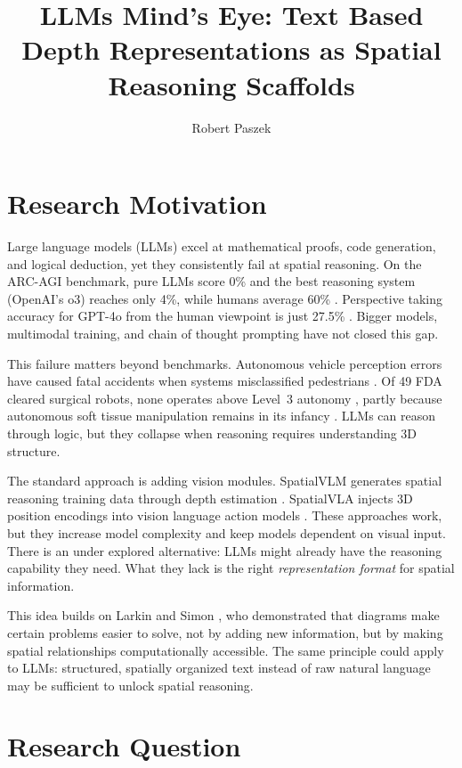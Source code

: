 \documentclass[stu,12pt,a4paper,floatsintext]{apa7}
\title{LLMs Mind's Eye: Text Based Depth Representations as Spatial Reasoning Scaffolds}
\author{Robert Paszek}
\affiliation{Department of Cognitive Science and Artificial Intelligence, Tilburg University}
\begin{document}
\maketitle

\section*{Research Motivation}

Large language models (LLMs) excel at mathematical proofs, code generation, and logical deduction, yet they consistently fail at spatial reasoning. On the ARC\nobreakdash-AGI benchmark, pure LLMs score 0\% and the best reasoning system (OpenAI's o3) reaches only 4\%, while humans average 60\% \cite{chollet2025}. Perspective taking accuracy for GPT\nobreakdash-4o from the human viewpoint is just 27.5\% \cite{shiri2024}. Bigger models, multimodal training, and chain of thought prompting have not closed this gap.

This failure matters beyond benchmarks. Autonomous vehicle perception errors have caused fatal accidents when systems misclassified pedestrians \cite{ntsb2019}. Of 49 FDA cleared surgical robots, none operates above Level~3 autonomy \cite{lee2024}, partly because autonomous soft tissue manipulation remains in its infancy \cite{khanna2025}. LLMs can reason through logic, but they collapse when reasoning requires understanding 3D structure.

The standard approach is adding vision modules. SpatialVLM generates spatial reasoning training data through depth estimation \cite{chen2024spatialvlm}. SpatialVLA injects 3D position encodings into vision language action models \cite{qu2025spatialvla}. These approaches work, but they increase model complexity and keep models dependent on visual input. There is an under explored alternative: LLMs might already have the reasoning capability they need. What they lack is the right \emph{representation format} for spatial information.

This idea builds on Larkin and Simon \cite{larkin1987}, who demonstrated that diagrams make certain problems easier to solve, not by adding new information, but by making spatial relationships computationally accessible. The same principle could apply to LLMs: structured, spatially organized text instead of raw natural language may be sufficient to unlock spatial reasoning.

\section*{Research Question}
\end{document}
